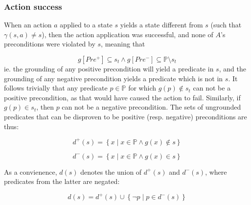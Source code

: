 \documentclass[../../Master.tex]{subfiles}
\begin{document}
\subsubsection*{Action success}
When an action $a$ applied to a state $s$ yields a state different from $s$ (such that $\gamma (s, a) \neq s$), then the action application was successful, and none of $A$'s preconditions were violated by $s$, meaning that

        \[ g\left[Pre^+\right] \subseteq s_t \land
            g\left[Pre^-\right] \subseteq \mathbb{P} \setminus s_t
        \]
ie. the grounding of any positive precondition will yield a predicate in $s$, and the grounding of any negative precondition yields a predicate which is not in $s$.
It follows trivially that any predicate $p \in \mathbb{P}$ for which $g(p) \notin s_t$ can not be a positive precondition, as that would have caused the action to fail. Similarly, if $g(p) \in s_t$, then $p$ can not be a negative precondition. The sets of ungrounded predicates that can be disproven to be positive (resp. negative) preconditions are thus:

\begin{equation*} \label{eq:DPlusTrans}
    d^+ (s) = \left\{ x \; | \; x \in \mathbb{P} \land g(x) \notin s \right\}
\end{equation*}

\begin{equation*} \label{eq:DMinusTrans}
    d^- (s) = \left\{ x \; | \; x \in \mathbb{P} \land g(x) \in s \right\}
\end{equation*}

As a convienence, $d(s)$ denotes the union of $d^+(s)$ and $d^-(s)$, where predicates from the latter are negated:

\begin{equation*}
    d(s) = d^+ (s) \cup \left\{ \neg p \; | \; p \in d^-(s) \right\}
\end{equation*}
\end{document}

